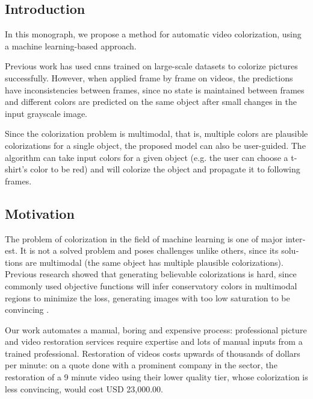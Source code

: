 \documentclass[12pt,openright,oneside,a4paper,english, brazilian]{abntex2}
\begin{document}
\begin{otherlanguage}{english}
\cleardoublepage
\listoffigures
\newpage
\listoftables
\newpage
\printnoidxglossary[type=\acronymtype, title=List of Initials and Abbreviations]
\newpage
\tableofcontents



\chapter{Introduction}
\textual
In this monograph, we propose a method for automatic video colorization, using a machine learning-based approach.

Previous work \cite{colorful} has used \acrshort{cnn}s trained on large-scale datasets to colorize pictures successfully. However, when applied frame by frame on videos, the predictions have inconsistencies between frames, since no state is maintained between frames and different colors are predicted on the same object after small changes in the input grayscale image.

Since the colorization problem is multimodal, that is, multiple colors are plausible colorizations for a single object, the proposed model can also be user-guided. The algorithm can take input colors for a given object (e.g. the user can choose a t-shirt's color to be red) and will colorize the object and propagate it to following frames.

\section{Motivation} \label{sec:Motivation}
The problem of colorization in the field of machine learning is one of major interest. It is not a solved problem and poses challenges unlike others, since its solutions are multimodal (the same object has multiple plausible colorizations). Previous research showed that generating believable colorizations is hard, since commonly used objective functions will infer conservatory colors in multimodal regions to minimize the loss, generating images with too low saturation to be convincing \cite{colorful}.

Our work automates a manual, boring and expensive process: professional picture and video restoration services require expertise and lots of manual inputs from a trained professional. Restoration of videos costs upwards of thousands of dollars per minute: on a quote done with a prominent company in the sector, the restoration of a 9 minute video using their lower quality tier, whose colorization is less convincing, would cost USD 23,000.00.


\end{otherlanguage}
\end{document}
